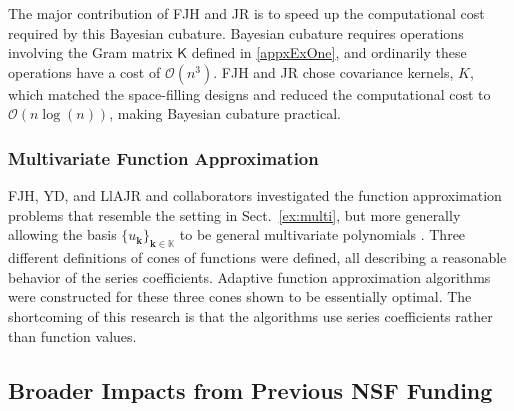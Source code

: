 \documentclass[11pt]{NSFamsart}
\newcommand{\bbK}{\mathbb{K}}
\newcommand{\mK}{\mathsf{K}}
\newcommand{\bk}{{\boldsymbol{k}}}
\newcommand{\Order}{\mathcal{O}}
\begin{document}
The major contribution of FJH and JR is to speed up the computational cost required by this Bayesian cubature.  Bayesian cubature requires operations
involving the Gram matrix $\mK$ defined in \eqref{appxExOne}, and ordinarily these operations  have a cost of
$\Order(n^3)$.  FJH and JR chose covariance kernels, $K$, which matched the space-filling designs and reduced the computational cost to $\Order(n 
\log(n))$, making Bayesian cubature practical.

\subsubsection{Multivariate Function Approximation} \label{sec:PrevFunAppx}

FJH, YD, and LlAJR and collaborators investigated the function approximation problems that resemble the setting in Sect.\ \ref{ex:multi}, but more generally allowing the basis $\{u_{\bk}\}_{\bk \in \bbK}$ to be general multivariate polynomials \cite{DinHic20a,DinEtal20a}.  Three different definitions of cones of functions were defined, all describing a reasonable behavior of the series coefficients.  Adaptive function approximation algorithms were constructed for these three cones shown to be essentially optimal.  The shortcoming of this research is that the algorithms use series coefficients rather than function values. 


\subsection{Broader Impacts from Previous NSF Funding} \label{prevBIsect}
\end{document}
